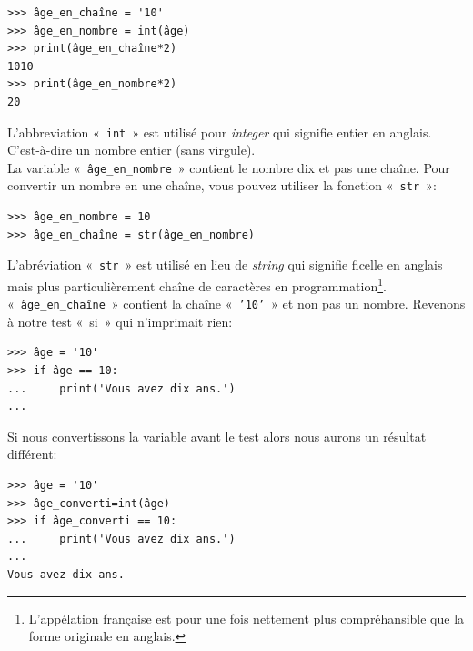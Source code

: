 \begin{Verbatim}[frame=single,rulecolor=\color{mbleu}, label=à taper]
>>> âge_en_chaîne = '10'
>>> âge_en_nombre = int(âge)
>>> print(âge_en_chaîne*2)
1010
>>> print(âge_en_nombre*2)
20
\end{Verbatim}

L'abbreviation «~\texttt{int}~»  est utilisé  pour \emph{integer} qui signifie entier en anglais. C'est-à-dire un nombre entier (sans virgule).\\

La variable «~\texttt{âge\_en\_nombre}~» contient le nombre dix et pas une chaîne. Pour convertir un nombre en une chaîne, vous pouvez utiliser la fonction «~\texttt{str}~»:

\begin{Verbatim}[frame=single,rulecolor=\color{mbleu}, label=à taper]
>>> âge_en_nombre = 10
>>> âge_en_chaîne = str(âge_en_nombre)
\end{Verbatim}

L'abréviation «~\texttt{str}~» est utilisé en lieu de \emph{string} qui signifie ficelle en anglais mais plus particulièrement chaîne de caractères en programmation\footnote{L'appélation française est pour une fois nettement plus compréhansible que la forme originale en anglais.}.\\

«~\texttt{âge\_en\_chaîne}~» contient la chaîne «~\texttt{'10'}~» et non pas un nombre. Revenons à notre test «~si~» qui n'imprimait rien:

\begin{Verbatim}[frame=single,rulecolor=\color{green}, label=à taper avec attention]
>>> âge = '10'
>>> if âge == 10:
...     print('Vous avez dix ans.')
...
\end{Verbatim}

Si nous convertissons la variable avant le test alors nous aurons un résultat différent:

\begin{Verbatim}[frame=single,rulecolor=\color{green}, label=à taper avec attention]
>>> âge = '10'
>>> âge_converti=int(âge)
>>> if âge_converti == 10:
...     print('Vous avez dix ans.')
...
Vous avez dix ans.
\end{Verbatim}



\clearemptydoublepage